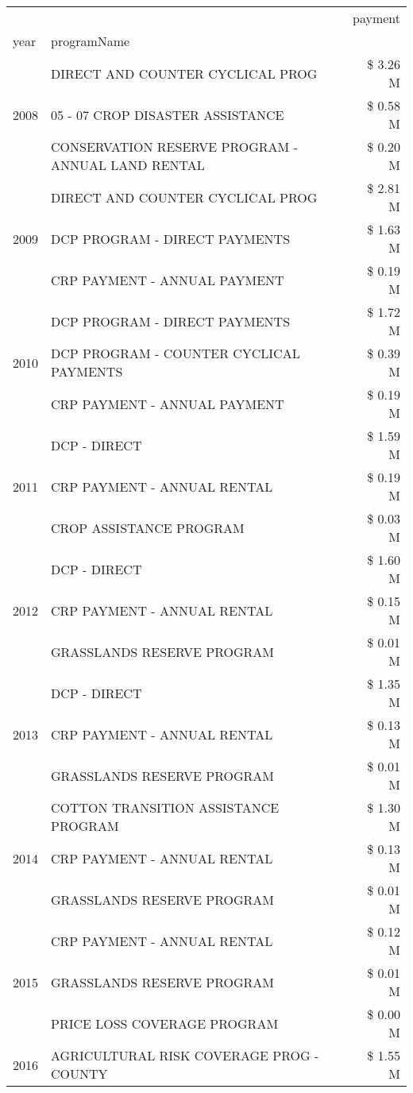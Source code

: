 \begin{tabular}{llr}
\toprule
 &  & payment \\
year & programName &  \\
\midrule
\multirow[t]{3}{*}{2008} & DIRECT AND COUNTER CYCLICAL PROG & \$ 3.26 M \\
 & 05 - 07 CROP DISASTER ASSISTANCE & \$ 0.58 M \\
 & CONSERVATION RESERVE PROGRAM - ANNUAL LAND RENTAL & \$ 0.20 M \\
\cline{1-3}
\multirow[t]{3}{*}{2009} & DIRECT AND COUNTER CYCLICAL PROG & \$ 2.81 M \\
 & DCP PROGRAM - DIRECT PAYMENTS & \$ 1.63 M \\
 & CRP PAYMENT - ANNUAL PAYMENT & \$ 0.19 M \\
\cline{1-3}
\multirow[t]{3}{*}{2010} & DCP PROGRAM - DIRECT PAYMENTS & \$ 1.72 M \\
 & DCP PROGRAM - COUNTER CYCLICAL PAYMENTS & \$ 0.39 M \\
 & CRP PAYMENT - ANNUAL PAYMENT & \$ 0.19 M \\
\cline{1-3}
\multirow[t]{3}{*}{2011} & DCP - DIRECT & \$ 1.59 M \\
 & CRP PAYMENT - ANNUAL RENTAL & \$ 0.19 M \\
 & CROP ASSISTANCE PROGRAM & \$ 0.03 M \\
\cline{1-3}
\multirow[t]{3}{*}{2012} & DCP - DIRECT & \$ 1.60 M \\
 & CRP PAYMENT - ANNUAL RENTAL & \$ 0.15 M \\
 & GRASSLANDS RESERVE PROGRAM & \$ 0.01 M \\
\cline{1-3}
\multirow[t]{3}{*}{2013} & DCP - DIRECT & \$ 1.35 M \\
 & CRP PAYMENT - ANNUAL RENTAL & \$ 0.13 M \\
 & GRASSLANDS RESERVE PROGRAM & \$ 0.01 M \\
\cline{1-3}
\multirow[t]{3}{*}{2014} & COTTON TRANSITION ASSISTANCE PROGRAM & \$ 1.30 M \\
 & CRP PAYMENT - ANNUAL RENTAL & \$ 0.13 M \\
 & GRASSLANDS RESERVE PROGRAM & \$ 0.01 M \\
\cline{1-3}
\multirow[t]{3}{*}{2015} & CRP PAYMENT - ANNUAL RENTAL & \$ 0.12 M \\
 & GRASSLANDS RESERVE PROGRAM & \$ 0.01 M \\
 & PRICE LOSS COVERAGE PROGRAM & \$ 0.00 M \\
\cline{1-3}
\multirow[t]{3}{*}{2016} & AGRICULTURAL RISK COVERAGE PROG - COUNTY      & \$ 1.55 M \\

\end{tabular}
